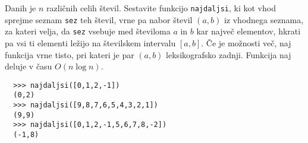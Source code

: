 \documentclass[arhiv]{../izpit}
\begin{document}

  Danih je $n$ različnih celih števil. Sestavite funkcijo \texttt{najdaljsi}, ki
  kot vhod sprejme seznam \texttt{sez} teh števil, vrne pa nabor števil $(a,b)$
  iz vhodnega seznama, za kateri velja, da \texttt{sez} vsebuje med številoma
  $a$ in $b$ kar največ elementov, hkrati pa vsi ti elementi ležijo na
  številskem intervalu $[a,b]$. Če je možnosti več, naj funkcija vrne tisto, pri
  kateri je par $(a,b)$ leksikografsko zadnji. Funkcija naj deluje v času $O(n
  \log n)$.

  \begin{verbatim}
  >>> najdaljsi([0,1,2,-1])
  (0,2)
  >>> najdaljsi([9,8,7,6,5,4,3,2,1])
  (9,9)
  >>> najdaljsi([0,1,2,-1,5,6,7,8,-2])
  (-1,8)
  \end{verbatim}  
\end{document}
